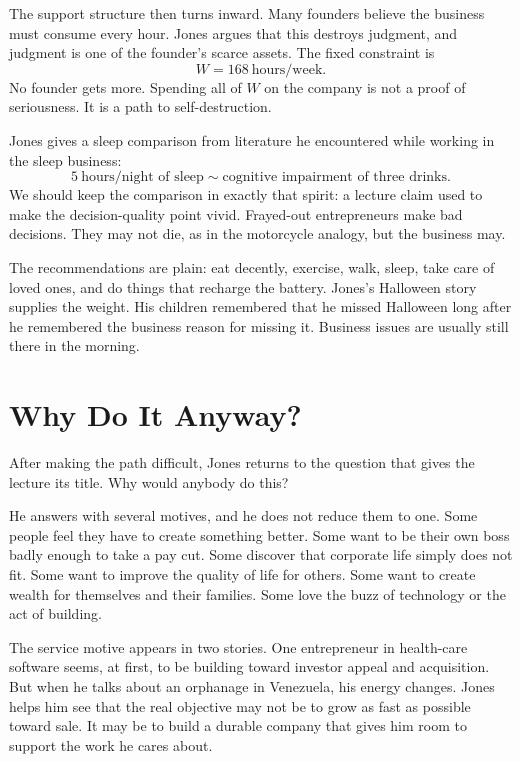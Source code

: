 The support structure then turns inward. Many founders believe the business must consume every hour. Jones argues that this destroys judgment, and judgment is one of the founder's scarce assets. The fixed constraint is
\begin{equation}
W=168\ \text{hours/week}.
\end{equation}
No founder gets more. Spending all of \(W\) on the company is not a proof of seriousness. It is a path to self-destruction.

Jones gives a sleep comparison from literature he encountered while working in the sleep business:
\begin{equation}
5\ \text{hours/night of sleep}
\sim
\text{cognitive impairment of three drinks}.
\end{equation}
We should keep the comparison in exactly that spirit: a lecture claim used to make the decision-quality point vivid. Frayed-out entrepreneurs make bad decisions. They may not die, as in the motorcycle analogy, but the business may.

The recommendations are plain: eat decently, exercise, walk, sleep, take care of loved ones, and do things that recharge the battery. Jones's Halloween story supplies the weight. His children remembered that he missed Halloween long after he remembered the business reason for missing it. Business issues are usually still there in the morning.

\section{Why Do It Anyway?}

After making the path difficult, Jones returns to the question that gives the lecture its title. Why would anybody do this?

He answers with several motives, and he does not reduce them to one. Some people feel they have to create something better. Some want to be their own boss badly enough to take a pay cut. Some discover that corporate life simply does not fit. Some want to improve the quality of life for others. Some want to create wealth for themselves and their families. Some love the buzz of technology or the act of building.

The service motive appears in two stories. One entrepreneur in health-care software seems, at first, to be building toward investor appeal and acquisition. But when he talks about an orphanage in Venezuela, his energy changes. Jones helps him see that the real objective may not be to grow as fast as possible toward sale. It may be to build a durable company that gives him room to support the work he cares about.


